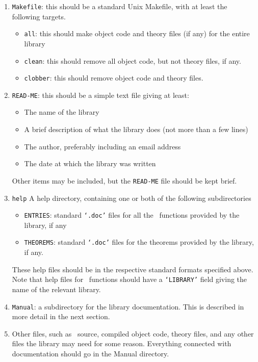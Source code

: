 \documentclass[12pt]{article}
\begin{document}
\begin{enumerate}

\item{\tt Makefile}: this should be a standard Unix Makefile, with at least the
following targets.

\begin{itemize}

\item{\tt all}: this should make object code and theory files (if any) for the
entire library

\item{\tt clean}: this should remove all object code, but not theory files, if
any.

\item{\tt clobber}: this should remove object code and theory files.

\end{itemize}

\item{\tt READ-ME}: this should be a simple text file giving at least:

\begin{itemize}
\item The name of the library
\item A brief description of what the library does (not more than a few lines)
\item The author, preferably including an email address
\item The date at which the library was written
\end{itemize}

Other items may be included, but the {\tt READ-ME} file should be kept brief.

\item{\tt help} A help directory, containing one or both of the following
subdirectories
\begin{itemize}
\item{\tt ENTRIES}: standard {\tt `.doc'} files for all the \ML\ functions
provided by the library, if any
\item{\tt THEOREMS}: standard {\tt `.doc'} files for the theorems provided by
the library, if any.
\end{itemize}

These help files should be in the respective standard formats specified above.
Note that help files for \ML\ functions should have a {\tt `LIBRARY'} field
giving the name of the relevant library.

\item{\tt Manual}: a subdirectory for the library documentation. This is
described in more detail in the next section.

\item Other files, such as \ML\ source, compiled object code, theory files, and
any other files the library may need for some reason. Everything connected with
documentation should go in the Manual directory.

\end{enumerate}
\end{document}
